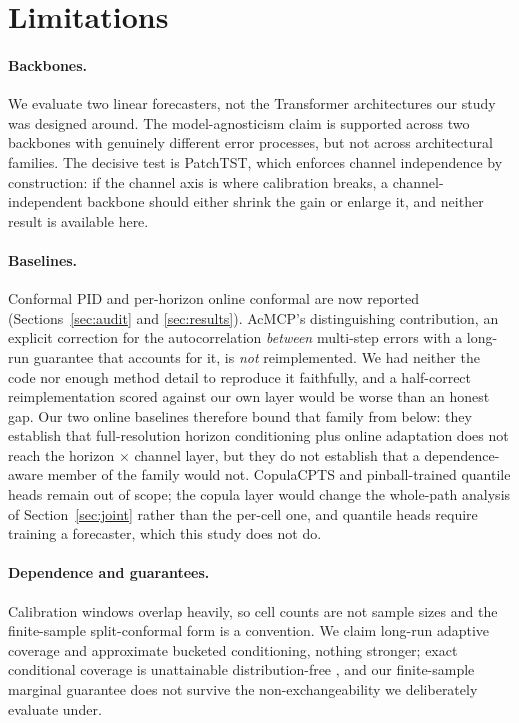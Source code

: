 \documentclass[11pt]{article}
\begin{document}
\section{Limitations}\label{sec:limitations}

\paragraph{Backbones.} We evaluate two linear forecasters, not the Transformer architectures our study was designed around. The model-agnosticism claim is supported across two backbones with genuinely different error processes, but not across architectural families. The decisive test is PatchTST, which enforces channel independence by construction: if the channel axis is where calibration breaks, a channel-independent backbone should either shrink the gain or enlarge it, and neither result is available here.

\paragraph{Baselines.} Conformal PID and per-horizon online conformal are now reported (Sections~\ref{sec:audit} and \ref{sec:results}). AcMCP's distinguishing contribution, an explicit correction for the autocorrelation \emph{between} multi-step errors with a long-run guarantee that accounts for it, is \emph{not} reimplemented. We had neither the code nor enough method detail to reproduce it faithfully, and a half-correct reimplementation scored against our own layer would be worse than an honest gap. Our two online baselines therefore bound that family from below: they establish that full-resolution horizon conditioning plus online adaptation does not reach the horizon $\times$ channel layer, but they do not establish that a dependence-aware member of the family would not. CopulaCPTS and pinball-trained quantile heads remain out of scope; the copula layer would change the whole-path analysis of Section~\ref{sec:joint} rather than the per-cell one, and quantile heads require training a forecaster, which this study does not do.

\paragraph{Dependence and guarantees.} Calibration windows overlap heavily, so cell counts are not sample sizes and the finite-sample split-conformal form is a convention. We claim long-run adaptive coverage and approximate bucketed conditioning, nothing stronger; exact conditional coverage is unattainable distribution-free \citep{barber2021}, and our finite-sample marginal guarantee does not survive the non-exchangeability we deliberately evaluate under.
\end{document}
